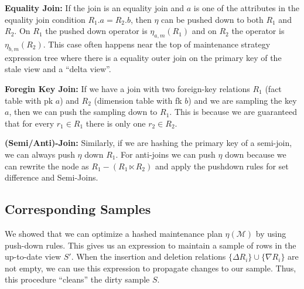 \vspace{.25em}

{\noindent \textbf{Equality Join:}} If the join is an equality join and $a$ is one of the attributes in the equality join condition $R_1.a = R_2.b$, then $\eta$ can be pushed down to both $R_1$ and $R_2$. On $R_1$ the pushed down operator is $\eta_{a, m}(R_1)$ and on $R_2$ the operator is $\eta_{b, m}(R_2)$. This case often happens near the top of maintenance strategy expression tree where there is a equality outer join on the primary key of the stale view and a ``delta view''.

\vspace{.25em}

{\noindent \textbf{Foregin Key Join:}} If we have a join with two foreign-key relations $R_1$ (fact table with pk $a$) and $R_2$ (dimension table with fk $b$) and we are sampling the key $a$, then we can push the sampling down to $R_1$. This is because we are guaranteed that for every $r_1\in R_1$ there is only one $r_2 \in R_2$.


\vspace{.25em}

{\noindent \textbf{(Semi/Anti)-Join:}} Similarly, if we are hashing the primary key of a semi-join, we can always push $\eta$ down $R_1$. For anti-joins we can push $\eta$ down because we can rewrite the node as $R_1 - (R_1 \ltimes R_2) $ and apply the pushdown rules for set difference and Semi-Joins.

\subsection{Corresponding Samples}
We showed that we can optimize a hashed maintenance plan $\eta(\mathcal{M})$ by using push-down rules.
This gives us an expression to maintain a sample of rows in the up-to-date view $S'$.
When the insertion and deletion relations $\{\Delta R_i\} \cup \{\nabla R_i\}$ are not empty, we can use
this expression to propagate changes to our sample.
Thus, this procedure ``cleans'' the dirty sample $S$.

